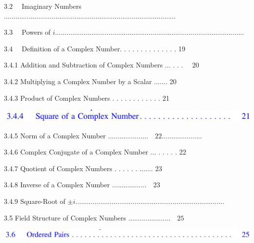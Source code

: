 \documentclass[10pt]{article}
\begin{document}
$3.2 \quad$ Imaginary Numbers $\ldots \ldots \ldots \ldots \ldots \ldots \ldots \ldots \ldots \ldots \ldots \ldots \ldots \ldots \ldots \ldots \ldots \ldots \ldots \ldots \ldots \ldots \ldots \ldots \ldots \ldots \ldots \ldots \ldots \ldots$

$3.3 \quad$ Powers of $i \ldots \ldots \ldots \ldots \ldots \ldots \ldots \ldots \ldots \ldots \ldots \ldots \ldots \ldots \ldots \ldots \ldots \ldots \ldots \ldots \ldots \ldots \ldots \ldots \ldots \ldots \ldots \ldots \ldots \ldots \ldots \ldots \ldots$

$3.4 \quad$ Definition of a Complex Number. . . . . . . . . . . . . . 19

3.4.1 Addition and Subtraction of Complex Numbers ... . . . $\quad 20$

3.4.2 Multiplying a Complex Number by a Scalar ....... 20

3.4.3 Product of Complex Numbers . . . . . . . . . . . . 21

\begin{center}
\includegraphics[max width=\textwidth]{2023_04_20_41f1ceac5a31dc7d1b59g-010(3)}
\end{center}

3.4.5 Norm of a Complex Number $\ldots \ldots \ldots \ldots \ldots \ldots \ldots \quad 22 \ldots \ldots \ldots \ldots \ldots \ldots \ldots$

3.4.6 Complex Conjugate of a Complex Number ... . . . . . 22

3.4.7 Quotient of Complex Numbers . . . . . . ....... 23

3.4.8 Inverse of a Complex Number $\ldots \ldots \ldots \ldots \ldots \ldots \quad 23$

3.4.9 Square-Root of $\pm i \ldots \ldots \ldots \ldots \ldots \ldots \ldots \ldots \ldots \ldots \ldots \ldots \ldots \ldots \ldots \ldots \ldots \ldots \ldots \ldots \ldots \ldots \ldots \ldots \ldots \ldots$

3.5 Field Structure of Complex Numbers $\ldots \ldots \ldots \ldots \ldots . \ldots \ldots \quad 25$

\begin{center}
\includegraphics[max width=\textwidth]{2023_04_20_41f1ceac5a31dc7d1b59g-010}
\end{center}
\end{document}
